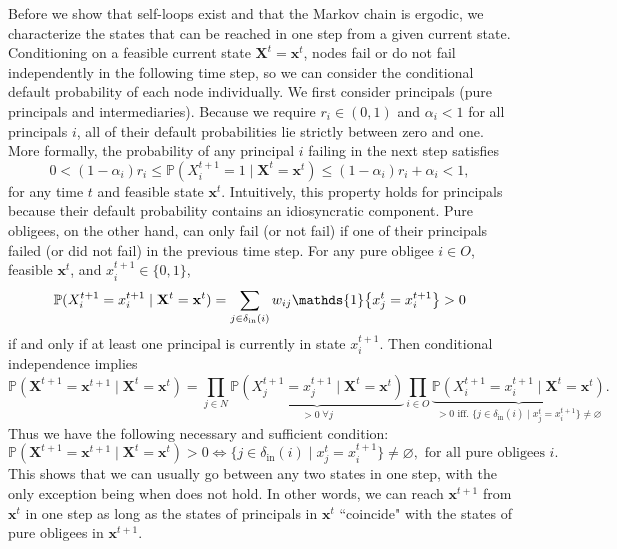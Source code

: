 \documentclass[mnsc,nonblindrev]{informs3}
\newcommand{\Ind}[1]{\mathds{1}\left\{ #1 \right\}}
\renewcommand{\Pr}{\mathbb{P}}
\newcommand{\din}{\delta_{\text{in}}}
\newcommand{\Xvec}{\mathbf{X}}
\newcommand{\xvec}{\mathbf{x}}
\newcommand{\oblig}{O}
\newcommand{\noblig}{N}
\let\originalleft\left
\let\originalright\right
\renewcommand{\left}{\mathopen{}\mathclose\bgroup\originalleft}
\renewcommand{\right}{\aftergroup\egroup\originalright}
\renewenvironment{proof}[1][Proof]{%
  \par\noindent{\itshape #1.} \ignorespaces
}{%
  \hfill\Halmos\par
}
\begin{document}
\begin{APPENDICES}
\begin{proof}
    Before we show that self-loops exist and that the Markov chain is ergodic, we characterize the states that can be reached in one step from a given current state.
    Conditioning on a feasible current state $\Xvec^t=\xvec^t$, nodes fail or do not fail independently in the following time step, so we can consider the conditional default probability of each node individually.
    We first consider principals (pure principals and intermediaries).  Because we require $r_i\in(0,1)$ and $\alpha_i<1$ for all principals $i$, all of their default probabilities lie strictly between zero and one.  More formally, the probability of any principal $i$ failing in the next step satisfies
    \begin{equation}\label{eq:stochastic_principal_states}
        0 < (1-\alpha_i)r_i \leq \Pr(X_i^{t+1}=1 \mid \Xvec^t = \xvec^t) \leq (1-\alpha_i)r_i + \alpha_i < 1,
    \end{equation}
    for any time $t$ and feasible state $\xvec^t$.  Intuitively, this property holds for principals because their default probability contains an idiosyncratic component.
    Pure obligees, on the other hand, can only fail (or not fail) if one of their principals failed (or did not fail) in the previous time step.
    For any pure obligee $i \in \oblig$, feasible $\xvec^t$, and $x^{t+1}_i\in\{0,1\}$,
    \[
        \Pr(X^{t+1}_i=x^{t+1}_i \mid \Xvec^t=\xvec^t)
        = \sum_{j\in\din(i)} w_{ij} \Ind{x^t_j=x^{t+1}_i} > 0
    \]
    if and only if at least one principal is currently in state $x^{t+1}_i$.
    Then conditional independence implies
    \[
        \Pr(\Xvec^{t+1}=\xvec^{t+1} \mid \Xvec^t=\xvec^t)
        = \prod_{j \in \noblig} \underbrace{\Pr(X^{t+1}_j=x^{t+1}_j \mid \Xvec^t=\xvec^t)}_{>0\;\forall j}
        \prod_{i \in \oblig} \underbrace{\Pr(X^{t+1}_i=x^{t+1}_i \mid \Xvec^t=\xvec^t)}_{>0\text{ iff. }\{j \in\din(i) \mid x^t_j=x^{t+1}_i\}\neq\varnothing}.
    \]
    Thus we have the following necessary and sufficient condition:
    \begin{equation}\label{eqn:reachable_prop}
        \Pr(\Xvec^{t+1}=\xvec^{t+1} \mid \Xvec^t=\xvec^t) > 0
        \iff
        \{ j \in\din(i) \mid x^t_j=x^{t+1}_i \}\neq\varnothing,\text{ for all pure obligees }i.
    \end{equation}
    This shows that we can usually go between any two states in one step, with the only exception being when  does not hold.
    In other words, we can reach $\xvec^{t+1}$ from $\xvec^t$ in one step as long as the states of principals in $\xvec^t$ ``coincide" with the states of pure obligees in $\xvec^{t+1}$.

\end{proof}
\end{APPENDICES}
\end{document}
